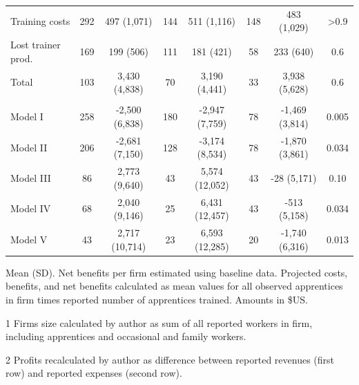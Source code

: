 \documentclass[
  11pt,
a4paper
]{article}
\begin{document}
\begin{table}[H]
{\begin{threeparttable}
\begin{tabular}[t]{lccccccc}
\hspace{1em}Training costs & 292 & 497 (1,071) & 144 & 511 (1,116) & 148 & 483 (1,029) & >0.9\\
\hspace{1em}Lost trainer prod. & 169 & 199 (506) & 111 & 181 (421) & 58 & 233 (640) & 0.6\\
\hspace{1em}Total & 103 & 3,430 (4,838) & 70 & 3,190 (4,441) & 33 & 3,938 (5,628) & 0.6\\
\addlinespace[0.3em]
\multicolumn{8}{l}{\textbf{Net benefits}}\\
\hspace{1em}Model I & 258 & -2,500 (6,838) & 180 & -2,947 (7,759) & 78 & -1,469 (3,814) & 0.005\\
\hspace{1em}Model II & 206 & -2,681 (7,150) & 128 & -3,174 (8,534) & 78 & -1,870 (3,861) & 0.034\\
\hspace{1em}Model III & 86 & 2,773 (9,640) & 43 & 5,574 (12,052) & 43 & -28 (5,171) & 0.10\\
\hspace{1em}Model IV & 68 & 2,040 (9,146) & 25 & 6,431 (12,457) & 43 & -513 (5,158) & 0.034\\
\hspace{1em}Model V & 43 & 2,717 (10,714) & 23 & 6,593 (12,285) & 20 & -1,740 (6,316) & 0.013\\
\bottomrule
\end{tabular}
\begin{tablenotes}
\small
\item Mean (SD). Net benefits per firm estimated using baseline data. 
Projected costs, benefits, and net benefits calculated as mean values for all observed apprentices in 
firm times reported number of apprentices trained. Amounts in \$US.
\item[1] Firms size calculated by author as sum of all reported workers in firm, including apprentices and occasional and family workers.
\item[2] Profits recalculated by author as difference between reported revenues (first row) and reported expenses (second row).
\end{tablenotes}
\end{threeparttable}}
\end{table}
\end{document}
